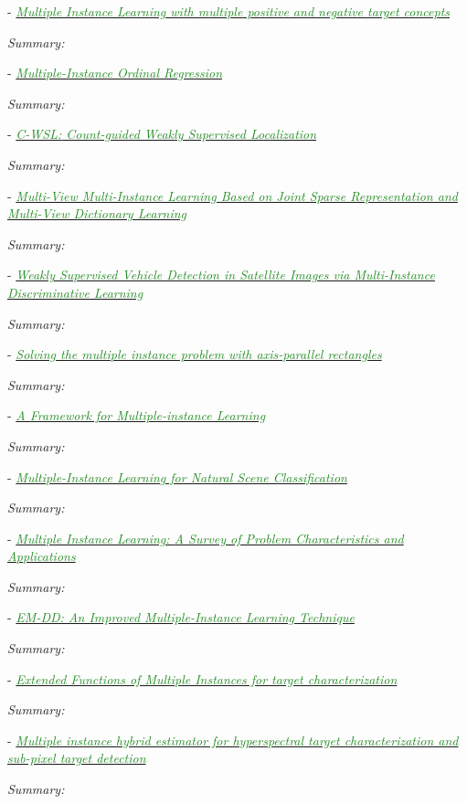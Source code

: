 \documentclass[]{article}
\newcommand{\paperentry}[4]{
            \hangindent=1cm
            \cite{#1} - \href{run:../References/#3}{\textcolor{ForestGreen}{\textit{#2}}}
            
            \noindent            
            \begin{minipage}[t]{0.1\linewidth}\hfill\end{minipage}
            \begin{minipage}[t]{0.8\linewidth}\textcolor{NavyBlue}{{\textit{Summary:}}}#4\end{minipage}
            \vspace{.25cm}
          }
\begin{document}
		
		\paperentry{Karem2016MILMultiplePositiveAndNegativeConcepts}
		{Multiple Instance Learning with multiple positive and negative target concepts}
		{Multiple_Instance_Learning/Karem2016MILMultiplePositiveAndNegativeConcepts.pdf}
		{}
		
		\paperentry{Xiao2017MIOrdinalRegression}
		{Multiple-Instance Ordinal Regression}
		{Multiple_Instance_Learning/Xiao2017MIOrdinalRegression.pdf}
		{}
		
		\paperentry{Gao2017CountGuidedWeaklySupervisedLocalization}
		{{C-WSL:} Count-guided Weakly Supervised Localization}
		{Multiple_Instance_Learning/Gao2017CountGuidedWeaklySupervisedLocalization.pdf}
		{}
		
		\paperentry{Li2017MultiviewMIL}
		{Multi-View Multi-Instance Learning Based on Joint Sparse Representation and Multi-View Dictionary Learning}
		{Multiple_Instance_Learning/Li2017MultiviewMIL.pdf}
		{}
		
		\paperentry{Cao2016VehicleDetectionMIL}
		{Weakly Supervised Vehicle Detection in Satellite Images via Multi-Instance Discriminative Learning}
		{Multiple_Instance_Learning/Cao2016VehicleDetectionMIL.pdf}
		{}
		
		\paperentry{Dietterich1996AxisParallelRectangles}
		{Solving the multiple instance problem with axis-parallel rectangles}
		{Multiple_Instance_Learning/Dietterich1996AxisParallelRectangles.pdf}
		{}
		
		\paperentry{Maron1998DiverseDensity}
		{A Framework for Multiple-instance Learning}
		{Multiple_Instance_Learning/Maron1998DiverseDensity.pdf}
		{}
		
		\paperentry{Maron1998MILSceneClassification}
		{Multiple-Instance Learning for Natural Scene Classification}
		{Multiple_Instance_Learning/Maron1998MILSceneClassification.pdf}
		{}
		
		\paperentry{Carbonneau2016MILSurvey}
		{Multiple Instance Learning: {A} Survey of Problem Characteristics and Applications}
		{Multiple_Instance_Learning/Carbonneau2016MILSurvey.pdf}
		{}
		
		\paperentry{Zhang2002EMDD}
		{EM-DD: An Improved Multiple-Instance Learning Technique}
		{Multiple_Instance_Learning/Zhang2002EMDD.pdf}
		{}
		
		\paperentry{Zare2015eFUMI}
		{Extended Functions of Multiple Instances for target characterization}
		{Multiple_Instance_Learning/Zare2015eFUMI.pdf}
		{}
		
		\paperentry{Jiao2018MIHE2}
		{Multiple instance hybrid estimator for hyperspectral target characterization and sub-pixel target detection}
		{Multiple_Instance_Learning/Jiao2018MIHE2.pdf}
		{}
		
\end{document}
